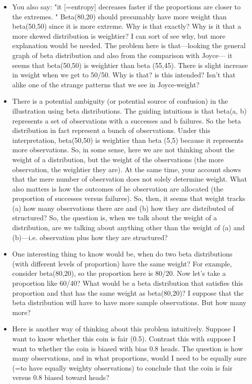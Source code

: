 \documentclass[
  10pt,
  dvipsnames,enabledeprecatedfontcommands]{scrartcl}
\begin{document}
\begin{itemize}
\item You also say: "it [=entropy] decreases faster if the proportions are closer to the extremes. "
Beta(80,20) should presumably have more weight than beta(50,50) since it is more extreme. Why is that exactly? Why is it that a more skewed distribution is weightier? I can sort of see why, but more explanation would be needed.
The problem here is that---looking the general graph of beta distribution and also from the comparison with Joyce---
it seems that beta(50,50) is weightier than beta (55,45). There is slight increase in weight when we get to 50/50. Why is that? is this intended? Isn't that alike one of the strange patterns that we see in Joyce-weight?


\item There is a potential ambiguity (or potential source of confusion) in the illustration using beta distributions.
The guiding intuitions is that beta(a, b) represents a set of observations with a successes and b failures.
So the beta distribution in fact represent a bunch of observations. Under this interpretation, beta(50,50) is weightier than
beta (5,5) because it represents more observations. So, in some sense, here we are not thinking about the weight of a distribution, but the weight of the observations (the more observation, the weightier they are). At the same time, your account shows that the mere number of observation does not solely determine weight. What also matters is how the outcomes of he observation are allocated (the proportion of successes versus failures). So, then, it seems that weight tracks (a) how many observations there are and (b) how they are distributed of structured?  So, the question is, when we talk about the weight of a distribution, are we talking about anything other than the weight of (a) and (b)---i.e. observation plus how they are structured?

\item One interesting thing to know would be, when do two beta distributions (with different levels of proportion) have the same weight? For example, consider beta(80,20), so the proportion here is 80/20. Now let's take a proportion like 60/40? What would be a beta distribution that satisfies this proportion and that has the same weight as beta(80,20)? I suppose that the beta distribution will have to have more sample observations. But how many more?


\item Here is another way of thinking about this problem intuitively. Suppose I want to know whether 
this coin is fair (0.5). Contrast this with suppose I want to whether the coin is biased with bias 0.8 heads.
The question is how many observations, and in what proportions, would I need to be equally sure (=to have equally weighty observations) to conclude that the coin is fair versus 0.8 biased toward heads?

\end{itemize}
\end{document}
